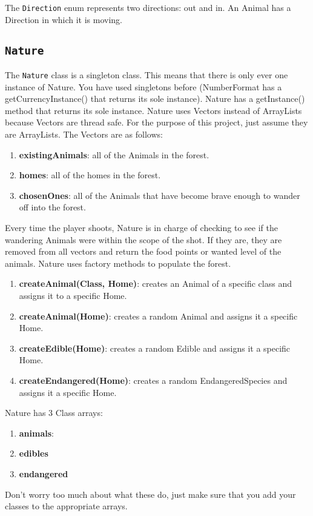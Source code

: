 \documentclass[12pt]{article}
\begin{document}
The {\tt Direction} enum represents two directions: out and in.  An Animal has a Direction in which it is moving.

\subsection{{\tt Nature}}

The {\tt Nature} class is a singleton class.  This means that there is only ever one instance of Nature.  You have used singletons before (NumberFormat has a getCurrencyInstance() that returns its sole instance).  Nature has a getInstance() method that returns its sole instance.
Nature uses Vectors instead of ArrayLists because Vectors are thread safe.  For the purpose of this project, just assume they are ArrayLists.
The Vectors are as follows:
\begin{enumerate}
    \item {\bf {existingAnimals}}:  all of the Animals in the forest.
    \item {\bf {homes}}:  all of the homes in the forest.
    \item {\bf {chosenOnes}}:  all of the Animals that have become brave enough to wander off into the forest.
    \end{enumerate}
Every time the player shoots, Nature is in charge of checking to see if the wandering Animals were within the scope of the shot.  If they are, they are removed from all vectors and return the food points or wanted level of the animals.
Nature uses factory methods to populate the forest.
\begin{enumerate}
    \item {\bf {createAnimal(Class, Home)}}: creates an Animal of a specific class and assigns it to a specific Home.
    \item {\bf {createAnimal(Home)}}: creates a random Animal and assigns it a specific Home.
    \item {\bf {createEdible(Home)}}: creates a random Edible and assigns it a specific Home.
    \item {\bf {createEndangered(Home)}}: creates a random EndangeredSpecies and assigns it a specific Home.
    \end{enumerate}

Nature has 3 Class arrays:
\begin{enumerate}
    \item {\bf {animals}}:
    \item {\bf {edibles}}
    \item {\bf {endangered}}
    \end{enumerate}
Don't worry too much about what these do, just make sure that you add your classes to the appropriate arrays.
\end{document}
